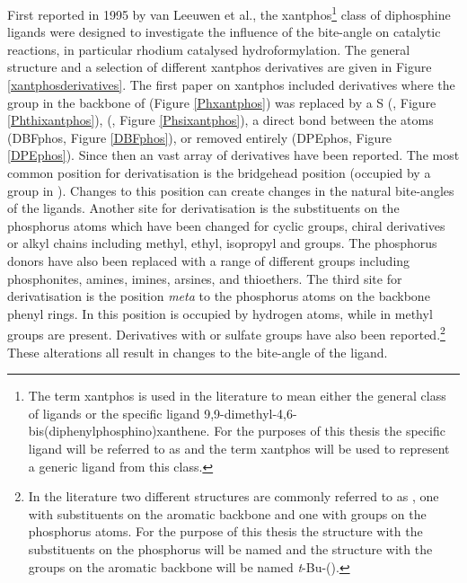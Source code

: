 First reported in 1995 by van Leeuwen et al., the \acrshort{xantphos}\footnote{The term xantphos is used in the literature to mean either the general class of ligands or the specific ligand 9,9-dimethyl-4,6-bis(diphenylphosphino)xanthene.  For the purposes of this thesis the specific ligand will be referred to as \Phxantphos{} and the term xantphos will be used to represent a generic ligand from this class.} class of diphosphine ligands were designed to investigate the influence of the bite-angle on catalytic reactions, in particular rhodium catalysed hydroformylation.\cite{Kranenburg1995}  The general structure and a selection of different xantphos derivatives are given in Figure \ref{xantphosderivatives}.  The first paper on xantphos included derivatives where the  group in the backbone of \Phxantphos{} (Figure \ref{Phxantphos}) was replaced by a S (\Phthixantphos, Figure \ref{Phthixantphos}),  (\Phsixantphos, Figure \ref{Phsixantphos}), a direct bond between the atoms (DBFphos, Figure \ref{DBFphos}), or removed entirely (DPEphos, Figure \ref{DPEphos}).  Since then an vast array of derivatives have been reported.  The most common position for derivatisation is the bridgehead position (occupied by a  group in \Phxantphos{}).  Changes to this position can create changes in the natural bite-angles of the ligands.  Another site for derivatisation is the substituents on the phosphorus atoms which have been changed for cyclic groups, chiral derivatives or alkyl chains including methyl, ethyl, isopropyl and \tBu{} groups.  The phosphorus donors have also been replaced with a range of different groups including phosphonites, amines, imines, arsines, and thioethers.\cite{Veen2000b, Malaise2006, Goertz1998, Haaren2002} The third site for derivatisation is the position \emph{meta} to the phosphorus atoms on the backbone phenyl rings.  In \Phxantphos{} this position is occupied by hydrogen atoms, while in \Phthixantphos{} methyl groups are present.  Derivatives with \tBu{} or sulfate groups have also been reported.\cite{Goedheijt1998, Goedheijt1998b, Veen1999}\footnote{In the literature two different structures are commonly referred to as  \tBuxantphos{}, one with \tBu{} substituents on the aromatic backbone and one with \tBu{} groups on the phosphorus atoms.  For the purpose of this thesis the structure with the \tBu{} substituents on the phosphorus will be named \tBuxantphos{} and the structure with the \tBu{} groups on the aromatic backbone will be named \emph{t}-Bu-(\Phxantphos).}  These alterations all result in changes to the bite-angle of the ligand.  

